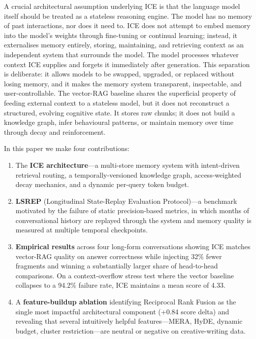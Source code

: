 \documentclass[11pt,a4paper]{article}
\begin{document}
A crucial architectural assumption underlying ICE is that the language model itself should be treated as a stateless reasoning engine. The model has no memory of past interactions, nor does it need to. ICE does not attempt to embed memory into the model's weights through fine-tuning or continual learning; instead, it externalises memory entirely, storing, maintaining, and retrieving context as an independent system that surrounds the model. The model processes whatever context ICE supplies and forgets it immediately after generation. This separation is deliberate: it allows models to be swapped, upgraded, or replaced without losing memory, and it makes the memory system transparent, inspectable, and user-controllable. The vector-RAG baseline shares the superficial property of feeding external context to a stateless model, but it does not reconstruct a structured, evolving cognitive state. It stores raw chunks; it does not build a knowledge graph, infer behavioural patterns, or maintain memory over time through decay and reinforcement.

In this paper we make four contributions:

\begin{enumerate}[leftmargin=*]
  \item The \textbf{ICE architecture}---a multi-store memory system with intent-driven retrieval routing, a temporally-versioned knowledge graph, access-weighted decay mechanics, and a dynamic per-query token budget.
  \item \textbf{LSREP} (Longitudinal State-Replay Evaluation Protocol)---a benchmark motivated by the failure of static precision-based metrics, in which months of conversational history are replayed through the system and memory quality is measured at multiple temporal checkpoints.
  \item \textbf{Empirical results} across four long-form conversations showing ICE matches vector-RAG quality on answer correctness while injecting 32\% fewer fragments and winning a substantially larger share of head-to-head comparisons. On a context-overflow stress test where the vector baseline collapses to a 94.2\% failure rate, ICE maintains a mean score of 4.33.
  \item A \textbf{feature-buildup ablation} identifying Reciprocal Rank Fusion as the single most impactful architectural component (+0.84 score delta) and revealing that several intuitively helpful features---MERA, HyDE, dynamic budget, cluster restriction---are neutral or negative on creative-writing data.
\end{enumerate}
\end{document}

